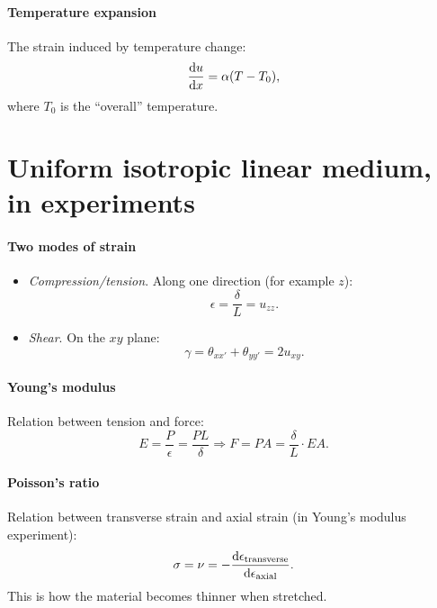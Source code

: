 \documentclass[hyperref, a4paper]{article}
\begin{document}
\paragraph*{Temperature expansion} The strain induced by temperature change:
\begin{equation}
    \dv{u}{x} = \alpha (T - T_0),
\end{equation}
where $T_0$ is the ``overall'' temperature.

\section{Uniform isotropic linear medium, in experiments} 

\paragraph*{Two modes of strain}
\begin{itemize}
    \item \emph{Compression/tension}. Along one direction (for example $z$):
    \begin{equation}
        \epsilon = \frac{\delta}{L} = u_{zz}.
    \end{equation}
    \item \emph{Shear}. On the $xy$ plane:
    \begin{equation}
        \gamma = \theta_{xx'} + \theta_{yy'} = 2 u_{xy}.
    \end{equation}
\end{itemize} 

\paragraph*{Young's modulus} Relation between tension and force:
\begin{equation}
    E = \frac{P}{\epsilon} = \frac{P L}{\delta} \Rightarrow
    F = PA = \frac{\delta}{L} \cdot EA.
\end{equation}

\paragraph*{Poisson's ratio} Relation between transverse strain and axial strain 
(in Young's modulus experiment):
\begin{equation}
    \sigma = \nu = - \dv{\epsilon_{\text{transverse}}}{\epsilon_{\text{axial}}}.
\end{equation}
This is how the material becomes thinner when stretched.
\end{document}
